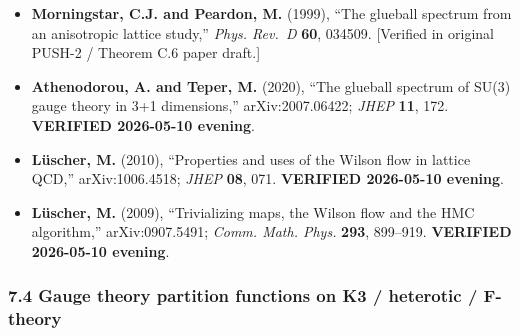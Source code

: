 \documentclass[
  11pt,
  a4paper,
]{article}
\begin{document}
\begin{itemize}
\item
  \textbf{Morningstar, C.J. and Peardon, M.} (1999), ``The glueball spectrum from an anisotropic lattice study,'' \emph{Phys. Rev.~D} \textbf{60}, 034509. {[}Verified in original PUSH-2 / Theorem C.6 paper draft.{]}
\item
  \textbf{Athenodorou, A. and Teper, M.} (2020), ``The glueball spectrum of SU(3) gauge theory in 3+1 dimensions,'' arXiv:2007.06422; \emph{JHEP} \textbf{11}, 172. \textbf{VERIFIED 2026-05-10 evening}.
\item
  \textbf{Lüscher, M.} (2010), ``Properties and uses of the Wilson flow in lattice QCD,'' arXiv:1006.4518; \emph{JHEP} \textbf{08}, 071. \textbf{VERIFIED 2026-05-10 evening}.
\item
  \textbf{Lüscher, M.} (2009), ``Trivializing maps, the Wilson flow and the HMC algorithm,'' arXiv:0907.5491; \emph{Comm. Math. Phys.} \textbf{293}, 899--919. \textbf{VERIFIED 2026-05-10 evening}.
\end{itemize}

\hypertarget{gauge-theory-partition-functions-on-k3-heterotic-f-theory}{%
\subsubsection{7.4 Gauge theory partition functions on K3 / heterotic / F-theory}\label{gauge-theory-partition-functions-on-k3-heterotic-f-theory}}
\end{document}

